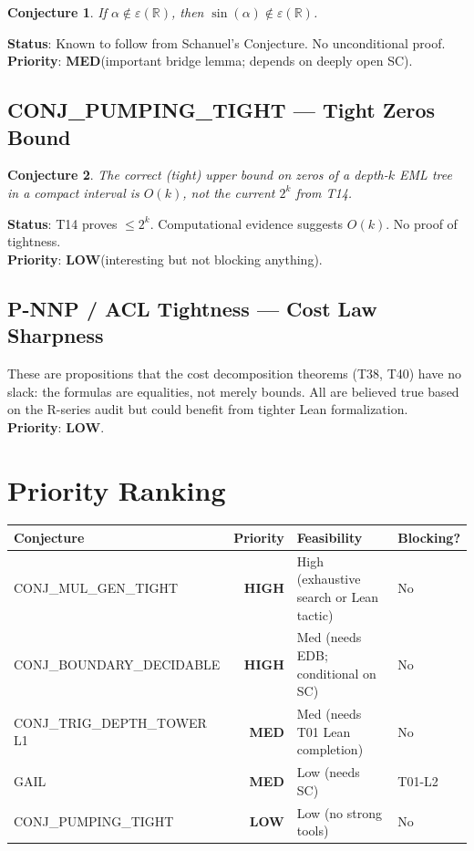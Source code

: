 \documentclass[11pt]{article}
\newtheorem{conjecture}{Conjecture}
\newcommand{\hp}{\textcolor{high}{\textbf{HIGH}}}
\newcommand{\mp}{\textcolor{med}{\textbf{MED}}}
\newcommand{\lp}{\textcolor{low}{\textbf{LOW}}}
\begin{document}
\begin{conjecture}
If $\alpha \notin \varepsilon(\mathbb{R})$, then $\sin(\alpha) \notin \varepsilon(\mathbb{R})$.
\end{conjecture}

\noindent\textbf{Status}: Known to follow from Schanuel's Conjecture. No unconditional proof.\\
\textbf{Priority}: \mp (important bridge lemma; depends on deeply open SC).

\subsection{CONJ\_PUMPING\_TIGHT — Tight Zeros Bound}

\begin{conjecture}
The correct (tight) upper bound on zeros of a depth-$k$ EML tree in a compact
interval is $O(k)$, not the current $2^k$ from T14.
\end{conjecture}

\noindent\textbf{Status}: T14 proves $\leq 2^k$. Computational evidence suggests $O(k)$.
No proof of tightness.\\
\textbf{Priority}: \lp (interesting but not blocking anything).

\subsection{P-NNP / ACL Tightness — Cost Law Sharpness}

These are propositions that the cost decomposition theorems (T38, T40) have no
slack: the formulas are equalities, not merely bounds. All are believed true based
on the R-series audit but could benefit from tighter Lean formalization.\\
\textbf{Priority}: \lp.

\section{Priority Ranking}

\begin{center}
\begin{tabular}{lrll}
\toprule
Conjecture & Priority & Feasibility & Blocking? \\
\midrule
CONJ\_MUL\_GEN\_TIGHT & \hp & High (exhaustive search or Lean tactic) & No \\
CONJ\_BOUNDARY\_DECIDABLE & \hp & Med (needs EDB; conditional on SC) & No \\
CONJ\_TRIG\_DEPTH\_TOWER L1 & \mp & Med (needs T01 Lean completion) & No \\
GAIL & \mp & Low (needs SC) & T01-L2 \\
CONJ\_PUMPING\_TIGHT & \lp & Low (no strong tools) & No \\
\bottomrule
\end{tabular}
\end{center}
\end{document}

